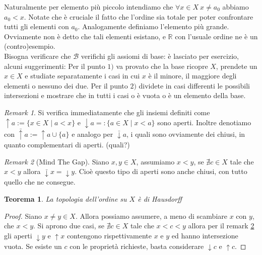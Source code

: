 \documentclass[10pt,a4paper]{article}
\theoremstyle{definition}
\theoremstyle{plain}
\newtheorem{teo}{Teorema}
\theoremstyle{remark}
\newtheorem{rem}{Remark}
\theoremstyle{remark}
\newcommand{\R}{\mathbb{R}}
\newcommand{\B}{\mathcal{B}}
\begin{document}
Naturalmente per elemento più piccolo intendiamo che $\forall x \in X \ x \neq
a_0$ abbiamo $a_0 < x $. Notate che è cruciale il fatto che l'ordine sia totale
per poter confrontare tutti gli elementi con $a_0$. Analogamente definiamo
l'elemento più grande. Ovviamente non è detto che tali elementi esistano, e $\R$
con l'usuale ordine ne è un (contro)esempio. \\ Bisogna verificare che $\B$
verifichi gli assiomi di base: è lasciato per esercizio, alcuni suggerimenti:
Per il punto $1)$ va provato che la base ricopre $X$, prendete un $x \in X$ e
studiate separatamente i casi in cui $x$ è il minore, il maggiore degli elementi
o nessuno dei due. Per il punto $2)$ dividete in casi differenti le possibili
intersezioni e mostrare che in tutti i casi o è vuota o è un elemento della
base.

\begin{rem} Si verifica immediatamente che gli insiemi definiti come $\uparrow a
:= \lbrace x \in X \mid a<x \rbrace$ e $\downarrow a =: \lbrace a \in X \mid x <
a \rbrace$ sono aperti. Inoltre denotiamo con $\bar{\uparrow}a := \uparrow a
\cup \{a\}$ e analogo per $\bar{\downarrow} a$, i quali sono ovviamente dei
chiusi, in quanto complementari di aperti. (quali?)
\end{rem}
\begin{rem}[Mind The Gap] \label{mindthegap} Siano $x,y \in X$, assumiamo $x <
y$, se $\nexists c \in X $ tale che $x < y$ allora $\bar{\downarrow} x =
\downarrow y$. Cioè questo tipo di aperti sono anche chiusi, con tutto quello
che ne consegue.
\end{rem}

\begin{teo} La topologia dell'ordine su $X$ è di Hausdorff
\end{teo}
\begin{proof} Siano $x \neq y \in X$. Allora possiamo assumere, a meno di
scambiare $x$ con $y$, che $x < y$. Si aprono due casi, se $\nexists c \in X $
tale che $x < c <y$ allora per il remark \ref{mindthegap} gli aperti $\downarrow
y$ e $\uparrow x$ contengono rispettivamente $x$ e $y$ ed hanno intersezione
vuota. Se esiste un $c$ con le proprietà richieste, basta considerare
$\downarrow c $ e $\uparrow c$.
\end{proof}
\end{document}
